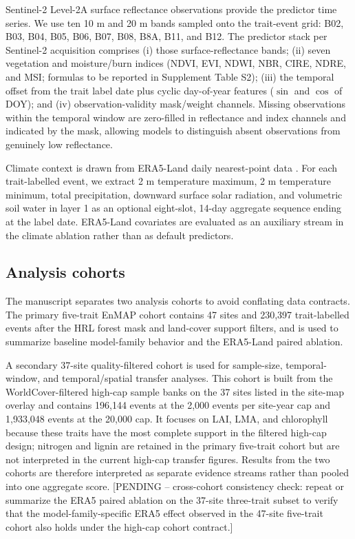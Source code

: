 \documentclass[final,times,onecolumn, authoryear]{elsarticle}
\begin{document}
\begin{linenumbers}
Sentinel-2 Level-2A surface reflectance observations \citep{drusch2012sentinel} provide the predictor time series. We use ten 10 m and 20 m bands sampled onto the trait-event grid: B02, B03, B04, B05, B06, B07, B08, B8A, B11, and B12. The predictor stack per Sentinel-2 acquisition comprises (i) those surface-reflectance bands; (ii) seven vegetation and moisture/burn indices (NDVI, EVI, NDWI, NBR, CIRE, NDRE, and MSI; formulas to be reported in Supplement Table S2); (iii) the temporal offset from the trait label date plus cyclic day-of-year features ($\sin$ and $\cos$ of DOY); and (iv) observation-validity mask/weight channels. Missing observations within the temporal window are zero-filled in reflectance and index channels and indicated by the mask, allowing models to distinguish absent observations from genuinely low reflectance.

Climate context is drawn from ERA5-Land daily nearest-point data \citep{munozsabater2021era5land}. For each trait-labelled event, we extract 2 m temperature maximum, 2 m temperature minimum, total precipitation, downward surface solar radiation, and volumetric soil water in layer 1 as an optional eight-slot, 14-day aggregate sequence ending at the label date. ERA5-Land covariates are evaluated as an auxiliary stream in the climate ablation rather than as default predictors.

\subsection{Analysis cohorts}

The manuscript separates two analysis cohorts to avoid conflating data contracts. The primary five-trait EnMAP cohort contains 47 sites and 230,397 trait-labelled events after the HRL forest mask and land-cover support filters, and is used to summarize baseline model-family behavior and the ERA5-Land paired ablation.

A secondary 37-site quality-filtered cohort is used for sample-size, temporal-window, and temporal/spatial transfer analyses. This cohort is built from the WorldCover-filtered high-cap sample banks on the 37 sites listed in the site-map overlay and contains 196,144 events at the 2,000 events per site-year cap and 1,933,048 events at the 20,000 cap. It focuses on LAI, LMA, and chlorophyll because these traits have the most complete support in the filtered high-cap design; nitrogen and lignin are retained in the primary five-trait cohort but are not interpreted in the current high-cap transfer figures. Results from the two cohorts are therefore interpreted as separate evidence streams rather than pooled into one aggregate score. [PENDING -- cross-cohort consistency check: repeat or summarize the ERA5 paired ablation on the 37-site three-trait subset to verify that the model-family-specific ERA5 effect observed in the 47-site five-trait cohort also holds under the high-cap cohort contract.]


\end{linenumbers}
\end{document}
